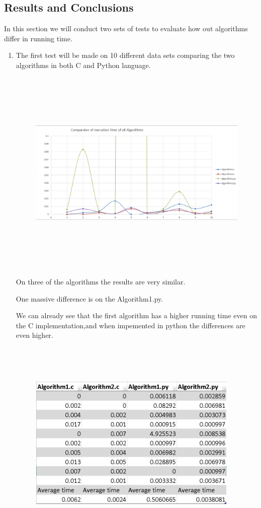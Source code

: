 \documentclass{article}
\begin{document}
\subsection{Results and Conclusions}
\par In this section we will conduct two sets of tests to evaluate how out algorithms differ in running time.
\begin{enumerate}
\item The first test will be made on 10 different data sets comparing the two algorithms in both C and Python language.

\begin{figure}[h]
\includegraphics[width=12 cm, height=10cm]{graph2}
\end{figure}
\par On three of the algorithms the results are very similar.
\par One massive difference is on the Algorithm1.py.
\par We can already see that the first algorithm has a higher running time even on the C implementation,and when impemented in python the differences are even higher.
\newpage
\begin{figure}[h]
\includegraphics[width=10cm, height=10cm]{table}

\end{figure}
\end{enumerate}
\end{document}

